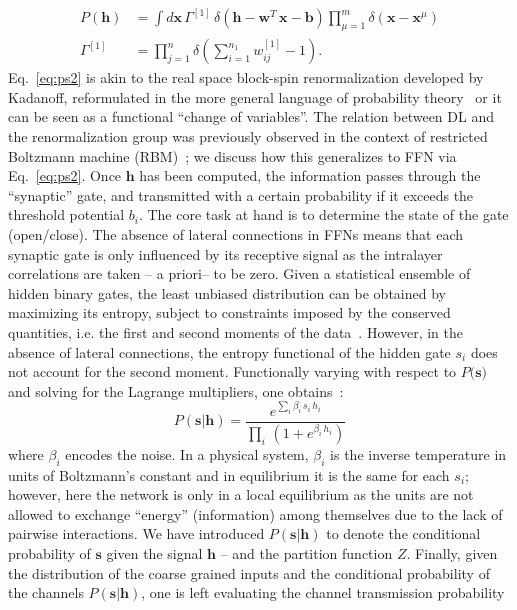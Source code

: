 \documentclass{article}
\begin{document}
%
\begin{align} \label{eq:ps2}
P(\mathbf{h}) &= \int {d\mathbf{x}} \, \Gamma^{[1]} \, \delta\left( \mathbf{h} -  \mathbf{w}^{T} \, \mathbf{x} - \mathbf{b} \right) \prod_{\mu =1}^m  \delta ( \mathbf{x} - \mathbf{x}^{\mu} ) \\ \nonumber
\Gamma^{[1]} &= \prod_{j=1}^n \delta\left( \sum_{i=1}^{n_1} w_{ij}^{[1]} -1 \right).
\end{align}
%
Eq.~\eqref{eq:ps2} is akin to the real space block-spin renormalization developed by Kadanoff, reformulated in the more general language of probability theory~\cite{roberto, ma, cassandro} or it can be seen as a functional ``change of variables''. The relation between  DL and the renormalization group was previously observed in the context of restricted Boltzmann machine (RBM)~\cite{mehta}; we discuss how this generalizes to FFN via Eq.~\eqref{eq:ps2}. Once $\mathbf{h}$ has been computed, the information passes through the ``synaptic'' gate, and transmitted with a certain probability if it exceeds the threshold potential $b_i$. The core task at hand is to determine the state of the gate (open/close). The absence of lateral connections in FFNs means that each synaptic gate is only influenced by its receptive signal as the intralayer correlations are taken -- a priori-- to be zero. Given a statistical ensemble of hidden binary gates, the least unbiased distribution  can be obtained by maximizing its entropy, subject to constraints imposed by the conserved quantities, i.e. the first and second moments of the data~\cite{zecchina, mckay}. However, in the absence of lateral connections, the entropy functional of the hidden gate $s_i$ does not account for the second moment.
%
Functionally varying with respect to $P(\mathbf{s)}$ and solving for the Lagrange multipliers, one  obtains~\cite{roberto}:
%
\begin{equation} \label{eq:entropy4}
P(\mathbf{s} | \mathbf{h}) = \frac{e^{ \sum_i \beta_i  \, s_i \, h_i }}{\prod_i \, \left( 1+ e^{\beta_i \, h_i} \right)}
\end{equation}
%
where $\beta_i$ encodes the noise.  In a physical system, $\beta_i$ is the inverse temperature in units of Boltzmann's constant and in equilibrium it is the same for each $s_i$; however, here the network is only in a local equilibrium as the units are not allowed to exchange ``energy'' (information) among themselves due to the lack of pairwise interactions. We have introduced $P(\mathbf{s} | \mathbf{h})$ to denote the conditional probability of $\mathbf{s}$ given the signal $\mathbf{h}$ --  and the partition function $Z$. Finally, given the distribution of the coarse grained inputs and the conditional probability of the channels $P(\mathbf{s}|\mathbf{h})$, one is left evaluating the channel transmission probability
\end{document}

